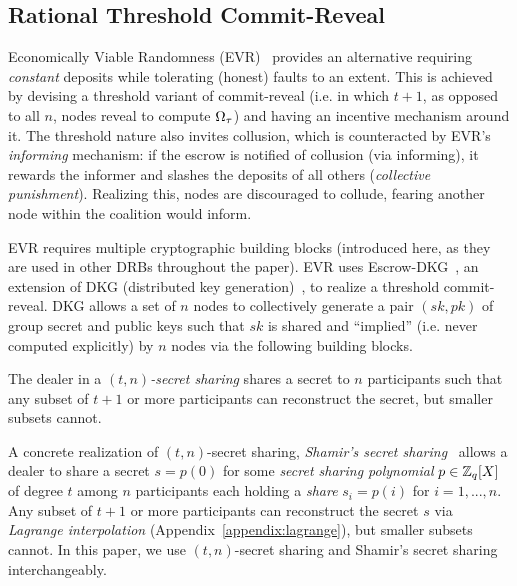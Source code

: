\subsection{Rational Threshold Commit-Reveal}
Economically Viable Randomness (EVR)~\cite{david2020economically} provides an alternative requiring \textit{constant} deposits while tolerating (honest) faults to an extent. This is achieved by devising a threshold variant of commit-reveal (i.e. in which $t + 1$, as opposed to all $n$, nodes reveal to compute $\Omega_\tau$) and having an incentive mechanism around it. The threshold nature also invites collusion, which is counteracted by EVR's \textit{informing} mechanism: if the escrow is notified of collusion (via informing), it rewards the informer and slashes the deposits of all others (\textit{collective punishment}). Realizing this, nodes are discouraged to collude, fearing another node within the coalition would inform.

EVR requires multiple cryptographic building blocks (introduced here, as they are used in other DRBs throughout the paper).
EVR uses Escrow-DKG~\cite{david2019rational}, an extension of DKG (distributed key generation)~\cite{pedersen1991threshold,gennaro1999secure,groth2021non,gurkan2021aggregatable}, to realize a threshold commit-reveal.
DKG allows a set of $n$ nodes to collectively generate a pair $(sk, pk)$ of group secret and public keys such that $sk$ is shared and ``implied'' (i.e. never computed explicitly) by $n$ nodes via the following building blocks.

\begin{definition}
The dealer in a \textit{$(t, n)$-secret sharing} shares a secret to $n$ participants such that any subset of $t + 1$ or more participants can reconstruct the secret, but smaller subsets cannot.
\end{definition}

\begin{definition}
A concrete realization of $(t, n)$-secret sharing, \textit{Shamir's secret sharing}~\cite{shamir1979share} allows a dealer to share a secret $s = p(0)$ for some \textit{secret sharing polynomial} $p \in \mathbb{Z}_q[X]$ of degree $t$ among $n$ participants each holding a \textit{share} $s_i = p(i)$ for $i = 1, ..., n$.
Any subset of $t + 1$ or more participants can reconstruct the secret $s$ via \textit{Lagrange interpolation} (Appendix~\ref{appendix:lagrange}), but smaller subsets cannot.
In this paper, we use $(t, n)$-secret sharing and Shamir's secret sharing interchangeably.
\end{definition}

